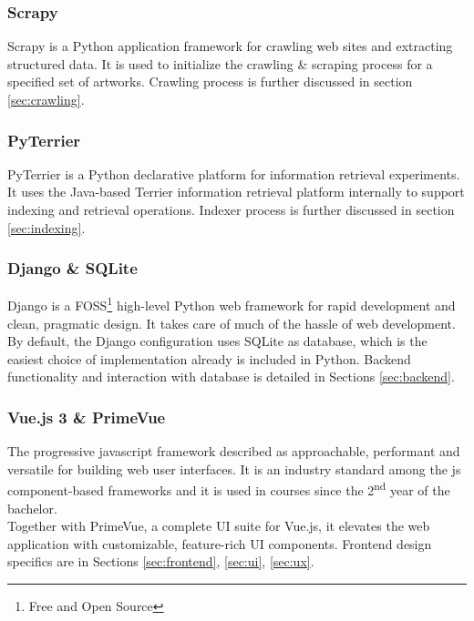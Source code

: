 \documentclass[12pt]{spieman}  %
\begin{document}
\begin{spacing}{1}
    \subsubsection{Scrapy}
    Scrapy is a Python application framework for crawling web sites and extracting structured data.
    It is used to initialize the crawling \& scraping process for a specified set of artworks.
    Crawling process is further discussed in section \ref{sec:crawling}.

    \subsubsection{PyTerrier}
    PyTerrier is a Python declarative platform for information retrieval experiments.
    It uses the Java-based Terrier information retrieval platform internally to support indexing and
    retrieval operations.
    Indexer process is further discussed in section \ref{sec:indexing}.

    \subsubsection{Django \& SQLite}
    Django is a
    FOSS\footnote{Free and Open Source}
    high-level Python web framework for rapid development and clean, pragmatic design.
    It takes care of much of the hassle of web development.\\
    By default, the Django configuration uses SQLite as database,
    which is the easiest choice of implementation already is included in Python.
    Backend functionality and interaction with database is detailed in Sections
    \ref{sec:backend}.

    \subsubsection{Vue.js 3 \& PrimeVue}
    The progressive javascript framework described as approachable, performant and versatile
    for building web user interfaces.
    It is an industry standard among the js component-based frameworks and it is used in courses
    since the 2\textsuperscript{nd} year of the bachelor.\\
    Together with PrimeVue, a complete UI suite for Vue.js, it elevates the web application with
    customizable, feature-rich UI components.
    Frontend design specifics are in Sections \ref{sec:frontend}, \ref{sec:ui}, \ref{sec:ux}.\\


\end{spacing}
\end{document}
